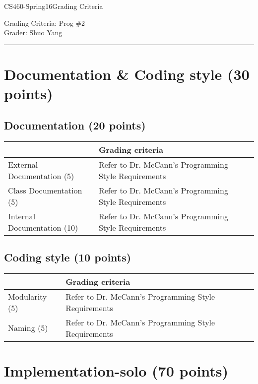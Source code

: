 \documentclass[10pt]{article}
\def\CourseCode{CS460-Spring16}
\def\Category{Grading Criteria}
\def\ProgNo{2}
\def\Grader{Shuo Yang}
\begin{document}
\noindent

\CourseCode \hfill \Category

\begin{center}
Grading Criteria: Prog \#\ProgNo\\
Grader: \Grader\\
\end{center}

\hrule\smallskip

\section{Documentation \& Coding style (30 points)}

\subsection{Documentation (20 points)}

\begin{tabular}{ | l | l | l | }
  \hline
  & Grading criteria \\ \hline
  External Documentation (5) & Refer to Dr. McCann's Programming Style
  Requirements\\ \hline
  Class Documentation (5) & Refer to Dr. McCann's Programming Style
  Requirements \\ \hline
  Internal Documentation (10) & Refer to Dr. McCann's Programming Style
  Requirements \\ \hline
\end{tabular}

\subsection{Coding style (10 points)}

\begin{tabular}{ | l | l | l | }
  \hline
  & Grading criteria \\ \hline
  Modularity (5) & Refer to Dr. McCann's Programming Style
  Requirements \\ \hline
  Naming (5) & Refer to Dr. McCann's Programming Style
  Requirements \\ \hline
\end{tabular}

\section{Implementation-solo (70 points)}
\end{document}
